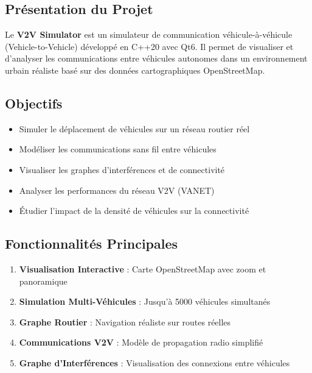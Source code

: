\documentclass[12pt,a4paper]{article}
\begin{document}
\subsection{Présentation du Projet}

Le \textbf{V2V Simulator} est un simulateur de communication véhicule-à-véhicule (Vehicle-to-Vehicle) développé en C++20 avec Qt6. Il permet de visualiser et d'analyser les communications entre véhicules autonomes dans un environnement urbain réaliste basé sur des données cartographiques OpenStreetMap.

\subsection{Objectifs}

\begin{itemize}[leftmargin=2cm]
    \item[\faCheck] Simuler le déplacement de véhicules sur un réseau routier réel
    \item[\faCheck] Modéliser les communications sans fil entre véhicules
    \item[\faCheck] Visualiser les graphes d'interférences et de connectivité
    \item[\faCheck] Analyser les performances du réseau V2V (VANET)
    \item[\faCheck] Étudier l'impact de la densité de véhicules sur la connectivité
\end{itemize}

\subsection{Fonctionnalités Principales}

\begin{enumerate}
    \item \textbf{Visualisation Interactive} : Carte OpenStreetMap avec zoom et panoramique
    \item \textbf{Simulation Multi-Véhicules} : Jusqu'à 5000 véhicules simultanés
    \item \textbf{Graphe Routier} : Navigation réaliste sur routes réelles
    \item \textbf{Communications V2V} : Modèle de propagation radio simplifié
    \item \textbf{Graphe d'Interférences} : Visualisation des connexions entre véhicules
\end{enumerate}

\end{document}
